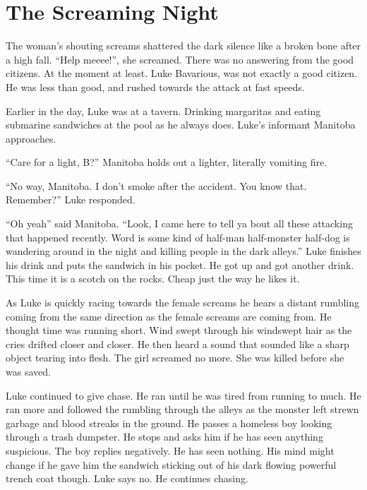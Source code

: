 \chapter{The Screaming Night}





The woman's shouting screams shattered the dark silence like
a broken bone after a high fall. ``Help meeee!'', she
screamed. There was no answering from the good citizens. At the
moment at least. Luke Bavarious, was not exactly a good citizen. He
was less than good, and rushed towards the attack at fast
speeds.



Earlier in the day, Luke was at a tavern. Drinking margaritas and
eating submarine sandwiches at the pool as he always does.
Luke's informant Manitoba approaches.



``Care for a light, B?'' Manitoba holds out a lighter,
literally vomiting fire.



``No way, Manitoba. I don't smoke after the accident.
You know that. Remember?'' Luke responded.



``Oh yeah'' said Manitoba. ``Look, I came here to
tell ya bout all these attacking that happened recently. Word is
some kind of half-man half-monster half-dog is wandering around in
the night and killing people in the dark alleys.'' Luke
finishes his drink and puts the sandwich in his pocket. He got up
and got another drink. This time it is a scotch on the rocks. Cheap
just the way he likes it.



As Luke is quickly racing towards the female screams he hears a
distant rumbling coming from the same direction as the female
screams are coming from. He thought time was running short. Wind
swept through his windswept hair as the cries drifted closer and
closer. He then heard a sound that sounded like a sharp object
tearing into flesh. The girl screamed no more. She was killed
before she was saved.



Luke continued to give chase. He ran until he was tired from
running to much. He ran more and followed the rumbling through the
alleys as the monster left strewn garbage and blood streaks in the
ground. He passes a homeless boy looking through a trash dumpster.
He stops and asks him if he has seen anything suspicious. The boy
replies negatively. He has seen nothing. His mind might change if
he gave him the sandwich sticking out of his dark flowing powerful
trench coat though. Luke says no. He continues chasing.



